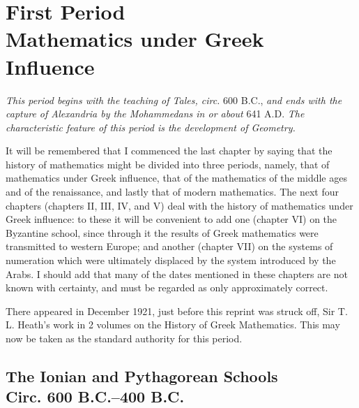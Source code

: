 \documentclass[12pt,oneside]{book}
\begin{document}
\part{First Period\\Mathematics under Greek Influence}

\textit{This period begins with the teaching of Tales, circ.} 600 B.C., \textit{and ends with the capture of Alexandria by the Mohammedans in or about} 641 A.D. \textit{The 
characteristic feature of this period is the development of Geometry.} \par 

It will be remembered that I commenced the last chapter by saying that the history of mathematics might be divided into three periods, namely, that of mathematics under Greek
influence, that of the mathematics of the middle ages and of the renaissance, and lastly that of modern mathematics. The next four chapters (chapters II, III, IV, and V) deal 
with the history of mathematics under Greek influence: to these it will be convenient to add one (chapter VI) on the Byzantine school, since through it the results of Greek mathematics
were transmitted to western Europe; and another (chapter VII) on the systems of numeration which were ultimately displaced by the system introduced by the Arabs. I should add that 
many of the dates mentioned in these chapters are not known with certainty, and must be regarded as only approximately correct. \par 

There appeared in December 1921, just before this reprint was struck off, Sir T. L. Heath's work in 2 volumes on the History of Greek Mathematics. This may now be taken as the 
standard authority for this period. \par 

\chapter[Ionian and Pythagorean Schools]{The Ionian and Pythagorean Schools\\Circ. 600 B.C.--400 B.C.}\footnotemark
\end{document}
